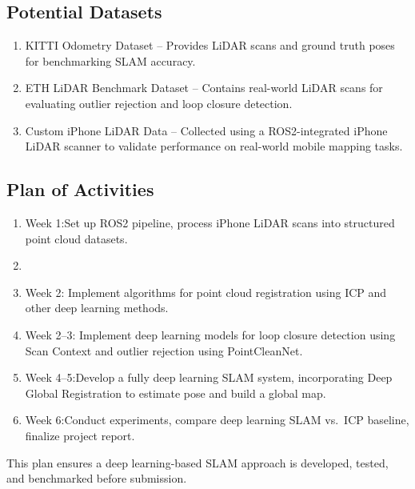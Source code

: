 \documentclass[nonanonymous]{article}
\begin{document}
\subsection*{Potential Datasets}
\begin{enumerate}
\item KITTI Odometry Dataset – Provides LiDAR scans and ground truth poses for benchmarking SLAM accuracy.


\item ETH LiDAR Benchmark Dataset – Contains real-world LiDAR scans for evaluating outlier rejection and loop closure detection.


\item Custom iPhone LiDAR Data – Collected using a ROS2-integrated iPhone LiDAR scanner to validate performance on real-world mobile mapping tasks.


\end{enumerate}

\subsection*{Plan of Activities}
\begin{enumerate}
\item Week 1:Set up ROS2 pipeline, process iPhone LiDAR scans into structured point cloud datasets.

\item \item Week 2: Implement algorithms for point cloud registration using ICP and other deep learning methods.

\item Week 2--3: Implement deep learning models for loop closure detection using Scan Context and outlier rejection using PointCleanNet.

\item Week 4--5:Develop a fully deep learning SLAM system, incorporating Deep Global Registration to estimate pose and build a global map.

\item Week 6:Conduct experiments, compare deep learning SLAM vs.\ ICP baseline, finalize project report.


\end{enumerate}
This plan ensures a deep learning-based SLAM approach is developed, tested, and benchmarked before submission.
\end{document}

